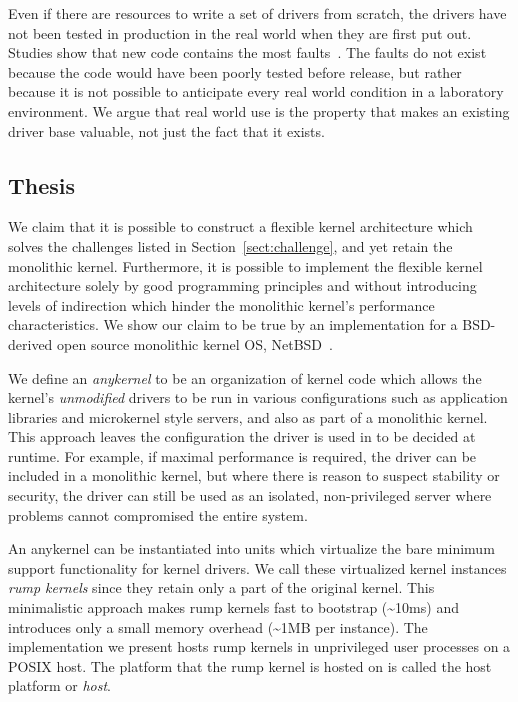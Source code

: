 Even if there are resources to write a set of drivers from scratch,
the drivers have not been tested in production in the real world when they
are first put out.  Studies show that new code contains the most
faults~\cite{chou:oserr,ostrand:faultdist}.  The faults do not exist
because the code would have been poorly tested before release, but rather
because it is not possible to anticipate every real world condition in a
laboratory environment.  We argue that real world use is the property that
makes an existing driver base valuable, not just the fact that it exists.

\subsection{Thesis}
\label{sect:thesis}

We claim that it is possible to construct a flexible kernel architecture
which solves the challenges listed in Section~\ref{sect:challenge}, and
yet retain the monolithic kernel.  Furthermore, it is possible to
implement the flexible kernel architecture solely by good programming
principles and without introducing levels of indirection which hinder
the monolithic kernel's performance characteristics.  We show our claim
to be true by an implementation for a BSD-derived open source monolithic
kernel OS, NetBSD~\cite{NetBSD}.

We define an \textit{anykernel} to be an organization of kernel code
which allows the kernel's \textit{unmodified} drivers to be run in
various configurations such as application libraries and microkernel
style servers, and also as part of a monolithic kernel.  This
approach leaves the configuration the driver is used in to be
decided at runtime.  For example, if maximal performance is
required, the driver can be included in a monolithic kernel, but
where there is reason to suspect stability or security, the driver
can still be used as an isolated, non-privileged server where
problems cannot compromised the entire system.

An anykernel can be instantiated into units which virtualize the
bare minimum support functionality for kernel drivers.  We call these
virtualized kernel instances \textit{rump kernels}
since they retain only a part of the original kernel.  This
minimalistic approach makes rump kernels fast to bootstrap (\~{ }10ms)
and introduces only a small memory overhead (\~{ }1MB per instance).
The implementation we present hosts rump kernels in unprivileged
user processes on a POSIX host.  The platform that the rump kernel is
hosted on is called the host platform or \textit{host}.

